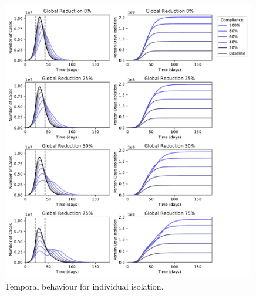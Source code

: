 \documentclass[10pt,a4paper]{article}
\begin{document}
\begin{figure}[H]
\begin{center}
  \includegraphics[width=0.99\textwidth]{figures/time_series.pdf}
\end{center}
\caption{Temporal behaviour for individual isolation.}
\end{figure}

\clearpage
\end{document}
